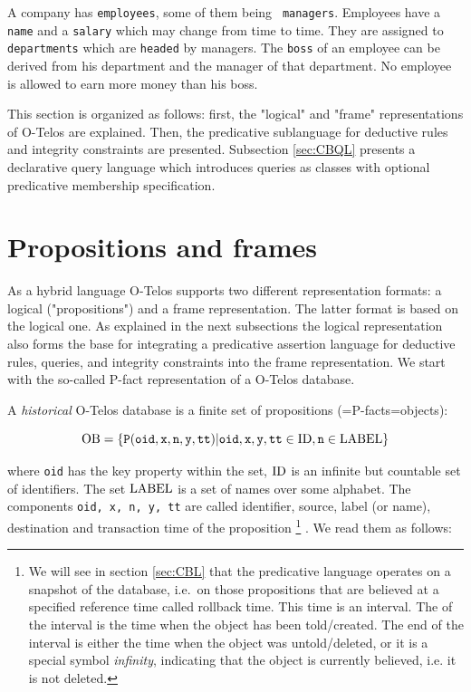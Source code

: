 \begin{example}
    {}A company has {\tt employees\/}, some of them being {\tt
    managers\/}. Employees have a {\tt name\/} and a {\tt salary}
    which may change from time to time. They are assigned to {\tt
    departments} which are {\tt headed} by managers. The {\tt boss} of
    an employee can be derived from his department and the manager of
    that department. No employee is allowed to earn more money than his
    boss.
\end{example}

This section is organized as follows: first, the "logical" and "frame"
representations of O-Telos are explained. Then, the predicative
sublanguage for deductive rules and integrity constraints are presented.
Subsection \ref{sec:CBQL} presents a declarative query language which introduces
queries as classes with optional predicative membership specification.



\section{Propositions and frames}
\label{sec:representation}

As a hybrid language O-Telos supports two different representation formats:
a logical ("propositions") and a frame representation. The
latter format is based on the logical one.  As explained in the next
subsections the logical representation also forms the base for integrating
a predicative assertion language for deductive rules, queries, and
integrity constraints into the frame representation. We start with the
so-called P-fact representation of a O-Telos database.


A {\em historical\/} O-Telos database is a finite set of propositions
(=P-facts=objects):

$$  \hbox{\rm OB} = \{{\tt P(oid,x,n,y,tt)}| {\tt oid,x,y,tt} \in \hbox{\rm ID}, {\tt n} \in \hbox{\rm LABEL}\} $$

where {\tt oid} has the key property within the set,
$\hbox{\rm ID}$ is an infinite but countable set
of identifiers. The set  $\hbox{\rm LABEL}$ is a set of names over some alphabet. The components {\tt oid,
x, n, y, tt} are called identifier, source, label (or name), destination and
transaction time of the proposition%
\footnote{We will see in section \ref{sec:CBL} that the predicative language operates
on a snapshot of the database, i.e.\ on those propositions that
are believed at a specified reference time called rollback time. This time is an
interval. The of the interval is the time when the object has been told/created.
The end of the interval is either the time when the object was untold/deleted, or
it is a special symbol {\it infinity}, indicating that the object is currently believed, i.e. it is
not deleted.}%
. We read them as follows:

